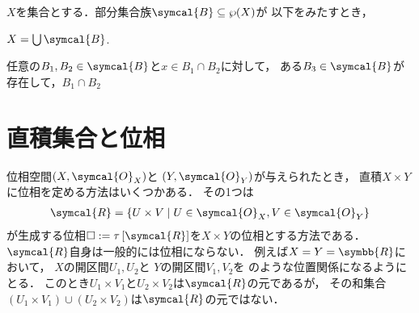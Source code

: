 \documentclass{ltjsbook}
\begin{document}
\begin{thmbox}
\begin{theorem}
\(X\)を集合とする．部分集合族\(\symcal{B} \subseteq \wp(X)\)が
以下をみたすとき，
\begin{conditions}
    \item \(X = \bigcup \symcal{B}\).
    \item 任意の\(B_1, B_2 \in \symcal{B}\)と\(x \in B_1 \cap B_2\)に対して，
        ある\(B_3 \in \symcal{B}\)が存在して，\(B_1 \cap B_2\)
\end{conditions}
\end{theorem}
\end{thmbox}

\section{直積集合と位相}
位相空間\(\tuple{X, \symcal{O}_X}\)と \(\tuple{Y, \symcal{O}_Y}\)が与えられたとき，
直積\(X \times Y\)に位相を定める方法はいくつかある．
その1つは
\begin{align*}
    \symcal{R} = \{ U \times V \mid U \in \symcal{O}_X, V \in \symcal{O}_Y\}
\end{align*}
が生成する位相\(\Box := \Generatedtopology{\symcal{R}}\)を\(X \times Y\)の位相とする方法である．
\(\symcal{R}\)自身は一般的には位相にならない．
例えば\(X = Y = \symbb{R}\)において，
\(X\)の開区間\(U_1, U_2\)と
\(Y\)の開区間\(V_1, V_2\)を
のような位置関係になるようにとる．
このとき\(U_1 \times V_1\)と\(U_2 \times V_2\)は\(\symcal{R}\)の元であるが，
その和集合\((U_1 \times V_1) \cup (U_2 \times V_2)\)は\(\symcal{R}\)の元ではない．
\end{document}
